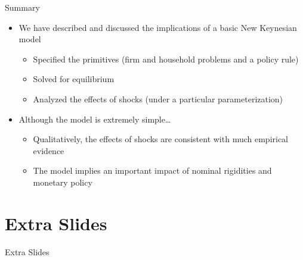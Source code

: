 \documentclass{beamer}
\begin{document}
\begin{frame}{Summary}

\begin{itemize}
\item	We have described and discussed the implications of a basic New Keynesian model
	\begin{itemize}
	\item	Specified the primitives (firm and household problems and a policy rule)
	\item	Solved for equilibrium
	\item	Analyzed the effects of shocks (under a particular parameterization)
	\end{itemize}
\vspace{3mm}	
\item	Although the model is extremely simple\ldots
	\begin{itemize}
	\item	Qualitatively, the effects of shocks are consistent with much empirical evidence
	\item	The model implies an important impact of nominal rigidities and monetary policy
	\end{itemize}
\end{itemize}

\end{frame}

\section{Extra Slides}

\begin{frame}

\begin{center}
{\LARGE Extra Slides}
\end{center}

\end{frame}
\end{document}
